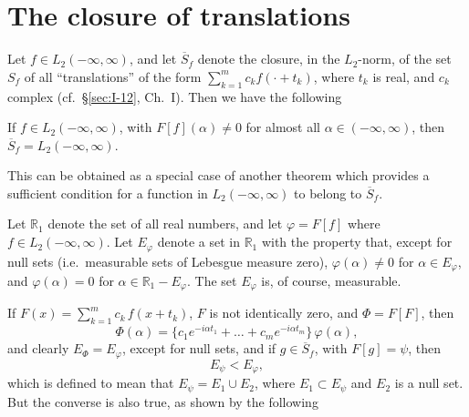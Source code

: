 \setcounter{section}{3}
\section{The closure of translations}
\label{sec:II-4}

Let $f\in L_{2}(-\infty,\infty)$, and let $\overline{S}_{f}$ denote the closure, in the $L_{2}$-norm, of the set $S_{f}$ of all ``translations'' of the form $\sum_{k=1}^{m}c_{k}f(\cdot+t_{k})$, where $t_{k}$ is real, and $c_{k}$ complex (cf.\ \S\ref{sec:I-12}, Ch.~I). Then we have the following

\begin{theorem}[Wiener]\label{thm:II-6}
If $f\in L_{2}(-\infty,\infty)$, with $F[f](\alpha)\neq 0$ for almost all $\alpha\in(-\infty,\infty)$, then $\overline{S}_{f}=L_{2}(-\infty,\infty)$.
\end{theorem}

This can be obtained as a special case of another theorem which provides a sufficient condition for a function in $L_{2}(-\infty,\infty)$ to belong to $\overline{S}_{f}$.

Let $\mathbb R_{1}$ denote the set of all real numbers, and let $\varphi=F[f]$ where $f\in L_{2}(-\infty,\infty)$. Let $E_{\varphi}$ denote a set in $\mathbb R_{1}$ with the property that, except for null sets (i.e.\ measurable sets of Lebesgue measure zero), $\varphi(\alpha)\neq 0$ for $\alpha\in E_{\varphi}$, and $\varphi(\alpha)=0$ for $\alpha\in\mathbb R_{1}-E_{\varphi}$. The set $E_{\varphi}$ is, of course, measurable.

If $F(x)=\sum_{k=1}^{m}c_{k}\,f(x+t_{k})$, $F$ is not identically zero, and $\Phi=F[F]$, then
\begin{equation}\tag{4.1}\label{eq:II-4.1}
\Phi(\alpha)=\{c_{1}e^{-i\alpha t_{1}}+\dots+c_{m}e^{-i\alpha t_{m}}\}\,\varphi(\alpha),
\end{equation}
and clearly $E_{\Phi}=E_{\varphi}$, except for null sets, and if $g\in\overline{S}_{f}$, with $F[g]=\psi$, then
\begin{equation}\tag{4.2}\label{eq:II-4.2}
E_{\psi}<E_{\varphi},
\end{equation}
which is defined to mean that $E_{\psi}=E_{1}\cup E_{2}$, where $E_{1}\subset E_{\psi}$ and $E_{2}$ is a null set. But the converse is also true, as shown by the following


